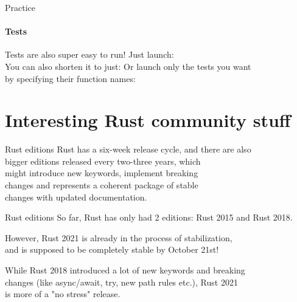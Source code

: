 \documentclass[usenames,dvipsnames,10pt,aspectratio=169]{beamer}
\begin{document}
\begin{frame}{Practice}
	\framesubtitle{Tests}
	\large
	Tests are also super easy to run! Just launch:\\
	\vspace{0.3cm}
	You can also shorten it to just: 
	\vspace{0.3cm}
Or launch only the tests you want\\
by specifying their function names: 
	
\end{frame}


\section{Interesting Rust community stuff}

\begin{frame}{Rust editions}
	\Large
	Rust has a six-week release cycle, and there are also\\
	bigger editions released every two-three years, which\\
	might introduce new keywords, implement breaking\\
	changes	and represents a coherent package of stable\\
	changes with updated documentation.\\

\end{frame}

\begin{frame}{Rust editions}
	\large
	So far, Rust has only had 2 editions: Rust 2015 and Rust 2018.\\

	\vspace{0.3cm}
	
	However, Rust 2021 is already in the process of stabilization,\\
	and is supposed to be completely stable by October 21st!\\

	\vspace{0.3cm}
	
	While Rust 2018 introduced a lot of new keywords and breaking\\
	changes (like \textcolor{ucuyellow}{async}/\textcolor{ucuyellow}{await}, \textcolor{ucuyellow}{try}, 
	new path rules etc.), Rust 2021\\
	is more of a "no stress" release.
\end{frame}
\end{document}
